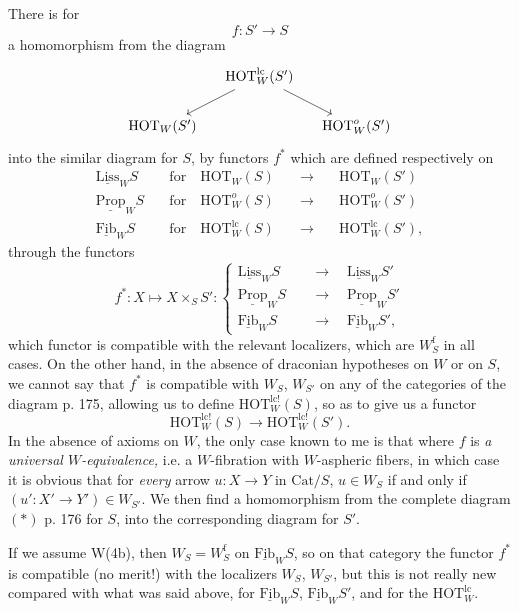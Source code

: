 \documentclass[11pt]{article}
\newcommand{\printedpage}[1]{\marginpar{\footnotesize p.~#1}}
\newcommand{\msp}[1]{\marginpar{\footnotesize [#1]}}
\newcommand{\und}[1]{\underline{\mathrm{#1}}}
\begin{document}
There is for
\[
f : S' \longrightarrow S
\]
a homomorphism from the diagram
\[
\begin{tikzcd}[column sep=small]
& \mathrm{HOT}^{\mathrm{lc}}_W(S') \arrow[dl] \arrow[dr] & \\
\mathrm{HOT}_W(S') & & \mathrm{HOT}^{o}_W(S')
\end{tikzcd}
\]
\msp{page 198}
into the similar diagram for $S$, by functors $f^*$ which are defined respectively on
\[
\begin{aligned}
\und{Liss}_W S &\quad \text{for}\quad \mathrm{HOT}_W(S) & \quad\longrightarrow\quad & \mathrm{HOT}_W(S')\\
\und{Prop}_W S &\quad \text{for}\quad \mathrm{HOT}^{o}_W(S) & \quad\longrightarrow\quad & \mathrm{HOT}^{o}_W(S')\\
\und{Fib}_W S &\quad \text{for}\quad \mathrm{HOT}^{\mathrm{lc}}_W(S) & \quad\longrightarrow\quad & \mathrm{HOT}^{\mathrm{lc}}_W(S'),
\end{aligned}
\]
through the functors %
\[
f^* : X \longmapsto X \times_S S' : \left\{
\begin{aligned}
\und{Liss}_W S &\quad\longrightarrow\quad \und{Liss}_W S'\\
\und{Prop}_W S &\quad\longrightarrow\quad \und{Prop}_W S'\\
\und{Fib}_W S &\quad\longrightarrow\quad \und{Fib}_W S',
\end{aligned}
\right.
\]
which functor is compatible with the relevant localizers, which are $W_S^{\mathrm{f}}$ in all cases. On the other hand, in the absence of draconian hypotheses on $W$ or on $S$, we cannot say that $f^*$ is compatible with $W_S$, $W_{S'}$ on any of the categories of the diagram p. 175, allowing us to define $\mathrm{HOT}^{\mathrm{lc!}}_W(S)$, so as to give us a functor %
\[
\mathrm{HOT}^{\mathrm{lc!}}_W(S) \longrightarrow \mathrm{HOT}^{\mathrm{lc!}}_W(S').
\]
In the absence of axioms on $W$, the only case known to me is that where $f$ is \textit{a universal $W$-equivalence,} i.e. a $W$-fibration with $W$-aspheric fibers, in which case it is obvious that for \textit{every} arrow $u : X \longrightarrow Y$ in $\mathrm{Cat}/S$, $u \in W_S$ if and only if $(u' : X' \longrightarrow Y') \in W_{S'}$. We then find a homomorphism from the complete diagram $(*)$ p. 176 for $S$, into the corresponding diagram for $S'$.

If we assume W(4b), then $W_S = W_S^{\mathrm{f}}$ on $\und{Fib}_W S$, so on that category the functor $f^*$ is compatible (no merit!) with the localizers $W_S$, $W_{S'}$, but this is not really new
\printedpage{123}
\msp{page 199}
compared with what was said above, for $\und{Fib}_W S$, $\und{Fib}_W S'$, and for the $\mathrm{HOT}^{\mathrm{lc}}_W$.
\end{document}
